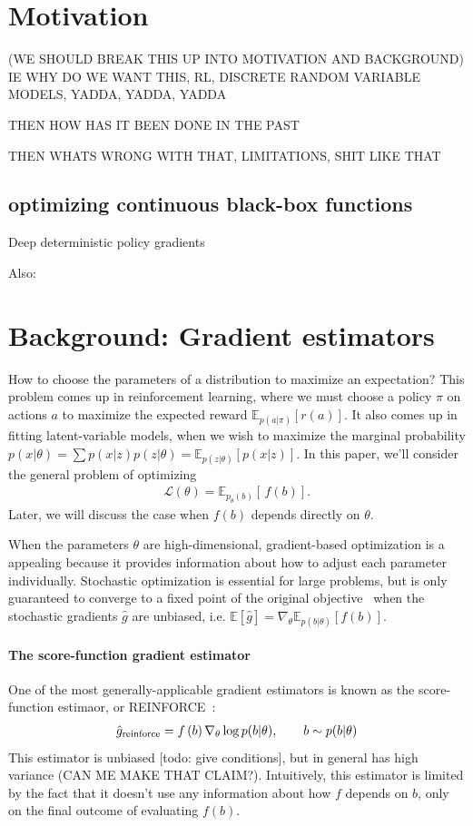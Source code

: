 \documentclass{article}
\newcommand{\discreteDist}{p_{\theta}(b)}
\newcommand{\loss}{f(b)}
\newcommand{\expectedLoss}{\mathbb{E}_{\discreteDist{}} \! \left[ \, \loss{} \right]}
\begin{document}
\section{Motivation}
(WE SHOULD BREAK THIS UP INTO MOTIVATION AND BACKGROUND)
IE 	WHY DO WE WANT THIS, RL, DISCRETE RANDOM VARIABLE MODELS, YADDA, YADDA, YADDA

THEN HOW HAS IT BEEN DONE IN THE PAST

THEN WHATS WRONG WITH THAT, LIMITATIONS, SHIT LIKE THAT
\subsection{optimizing continuous black-box functions}
\label{continuous}
Deep deterministic policy gradients \citep{lillicrap2015continuous}

Also: \citep{levine2016end}

\section{Background: Gradient estimators}


How to choose the parameters of a distribution to maximize an expectation?
This problem comes up in reinforcement learning, where we must choose a policy $\pi$ on actions $a$ to maximize the expected reward $\mathbb{E}_{p(a|\pi)} \left[ r(a) \right]$.
It also comes up in fitting latent-variable models, when we wish to maximize the marginal probability ${p(x|\theta) = \sum p(x|z) p(z|\theta) = \mathbb{E}_{p(z|\theta)} \left[ p(x|z) \right]}$.
In this paper, we'll consider the general problem of optimizing
%
\begin{align}
\mathcal{L}(\theta)=\expectedLoss{}.
\end{align}
%
Later, we will discuss the case when $\loss{}$ depends directly on $\theta$.

When the parameters $\theta$ are high-dimensional, gradient-based optimization is a appealing because it provides information about how to adjust each parameter individually.
Stochastic optimization is essential for large problems, but is only guaranteed to converge to a fixed point of the original objective~\citep{robbins1951stochastic} when the stochastic gradients $\hat g$ are unbiased, i.e. ${\mathbb{E} \left[ \hat g \right] = \nabla_\theta \mathbb{E}_{p(b|\theta)} \left[ f(b) \right]}$.

\paragraph{The score-function gradient estimator}
One of the most generally-applicable gradient estimators is known as the score-function estimaor, or REINFORCE~\citep{williams1992simple}:
%
\begin{align}
\hat g_\textnormal{reinforce} =  f \left( b \right) \nabla_\theta \log p(b | \theta), \qquad b \sim p(b | \theta)
\end{align}
%
This estimator is unbiased [todo: give conditions], but in general has high variance (CAN ME MAKE THAT CLAIM?).
Intuitively, this estimator is limited by the fact that it doesn't use any information about how $f$ depends on $b$, only on the final outcome of evaluating $f(b)$.
\end{document}
